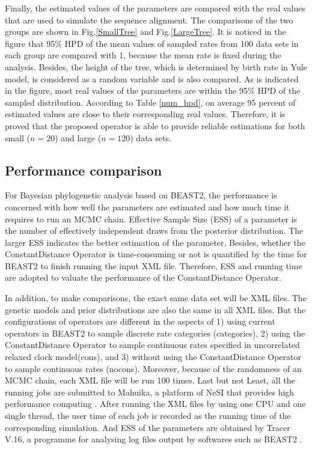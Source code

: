 \documentclass{bmcart}
\begin{document}
Finally, the estimated values of the parameters are compared with the real values that are used to simulate the sequence alignment. The comparisons of the two groups are shown in Fig.\ref{SmallTree} and Fig.\ref{LargeTree}. It is noticed in the figure that 95\% HPD of the mean values of sampled rates from 100 data sets in each group are compared with 1, because the mean rate is fixed during the analysis. Besides, the height of the tree, which is determined by birth rate in Yule model, is considered as a random variable and is also compared. As is indicated in the figure, most real values of the parameters are within the 95\% HPD of the sampled distribution. According to Table \ref{num_hpd}, on average 95 percent of estimated values are close to their corresponding real values. Therefore, it is proved that the proposed operator is able to provide reliable estimations for both small ($n=20$) and large ($n=120$) data sets.
\subsection*{Performance comparison}
For Bayesian phylogenetic analysis based on BEAST2, the performance is concerned with how well the parameters are estimated and how much time it requires to run an MCMC chain. Effective Sample Size (ESS) of a parameter is the number of effectively independent draws from the posterior distribution. The larger ESS indicates the better estimation of the parameter.  Besides, whether the ConstantDistance Operator is time-consuming or not is quantified by the time for BEAST2 to finish running the input XML file. Therefore, ESS and running time are adopted to valuate the performance of the ConstantDistance Operator. 

In addition, to make comparisons, the exact same data set will be XML files. The genetic models and prior distributions are also the same in all XML files. But the configurations of operators are different in the aspects of 1) using current operators in BEAST2 to sample discrete rate categories (categories), 2) using the ConstantDistance Operator  to sample continuous rates specified in uncorrelated relaxed clock model(cons), and 3) without using the ConstantDistance Operator to sample continuous rates (nocons). Moreover, because of the randomness of an MCMC chain, each XML file will be run 100 times. Last but not Least, all the running jobs are submitted to Mahuika, a platform of NeSI that provides high performance computing \cite{nesi}.  After running the XML files by using one CPU and one single thread, the user time of each job is recorded as the running time of the corresponding simulation. And ESS of the parameters are obtained by Tracer V.16, a programme for analysing log files output by softwares such as BEAST2 \cite{Tracer}.
\end{document}

